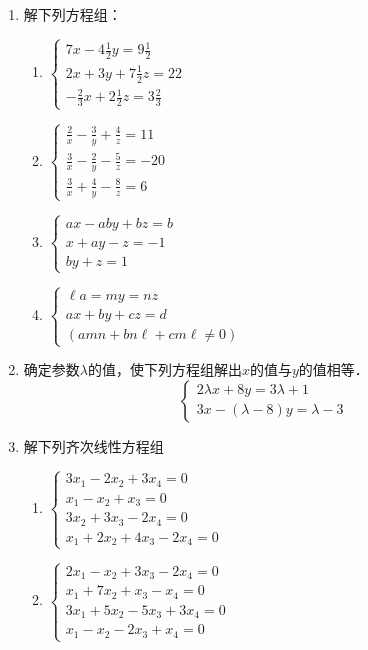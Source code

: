 \begin{enumerate}
\item 解下列方程组：
\begin{multicols}{2}
\begin{enumerate}
    \item $\begin{cases}
        7x-4\frac{1}{2}y=9\frac{1}{2}\\
        2x+3y+7\frac{1}{2}z=22\\
        -\frac{2}{3}x+2\frac{1}{2}z=3\frac{2}{3}
    \end{cases}$
    \item $\begin{cases}
        \frac{2}{x}-\frac{3}{y}+\frac{4}{z}=11\\
        \frac{3}{x}-\frac{2}{y}-\frac{5}{z}=-20\\
        \frac{3}{x}+\frac{4}{y}-\frac{8}{z}=6
    \end{cases}$
    \item $\begin{cases}
        ax-aby+bz=b\\
        x+ay-z=-1\\
        by+z=1
    \end{cases}$
    \item $\begin{cases}
        \ell a=my=nz\\
        ax+by+cz=d\\
        (amn+bn\ell+cm\ell\ne 0)
    \end{cases}$
\end{enumerate}
\end{multicols}

\item 确定参数$\lambda$的值，使下列方程组解出$x$的值与$y$的值相等．
\[\begin{cases}
    2\lambda  x+8y=3\lambda  +1 \\
    3x- (\lambda  -8) y=\lambda  -3
\end{cases}\]

\item 解下列齐次线性方程组
\begin{multicols}{2}
\begin{enumerate}
    \item $\begin{cases}
        3x_1-2x_2+3x_4=0\\
        x_1-x_2+x_3=0\\
        3x_2+3x_3-2x_4=0\\
        x_1+2x_2+4x_3-2x_4=0
    \end{cases}$
    \item $\begin{cases}
        2x_1-x_2+3x_3-2x_4=0\\
        x_1+7x_2+x_3-x_4=0\\
        3x_1+5x_2-5x_3+3x_4=0\\
        x_1-x_2-2x_3+x_4=0
    \end{cases}$
\end{enumerate}
\end{multicols}


\end{enumerate}
